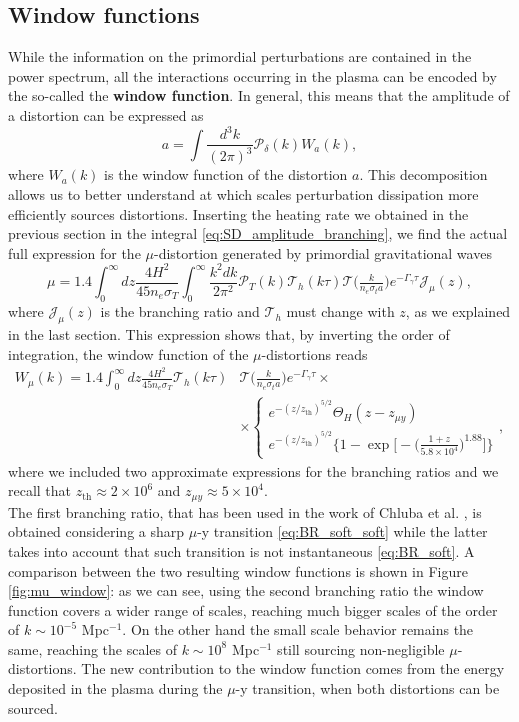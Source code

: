 \subsection{Window functions}
While the information on the primordial perturbations are contained in the power spectrum, all the interactions occurring in the plasma can be encoded by the so-called the \textbf{window function}. In general, this means that the amplitude of a distortion can be expressed as
\begin{equation}\label{eq:window_function}
    a=\int\frac{d^3k}{(2\pi)^3}\mathcal P_\delta(k) W_a(k),
\end{equation}
where $W_a(k)$ is the window function of the distortion $a$. This decomposition allows us to better understand at which scales perturbation dissipation more efficiently sources distortions. Inserting the heating rate we obtained in the previous section in the integral \eqref{eq:SD_amplitude_branching}, we find the actual full expression for the $\mu$-distortion generated by primordial gravitational waves
$$\mu=1.4\int_{0}^\infty dz\frac{4H^2}{45 n_e\sigma_T}\int_0^\infty\frac{k^2dk}{2\pi^2}\mathcal P_T(k)\mathcal T_h(k\tau)\mathcal T\Big(\tfrac{k}{n_e\sigma_ta}\Big)e^{-\Gamma_\gamma\tau}\mathcal{J}_\mu(z),$$
where $\mathcal{J}_\mu(z)$ is the branching ratio and $\mathcal T_h$ must change with $z$, as we explained in the last section.
This expression shows that, by inverting the order of integration, the window function of the $\mu$-distortions reads
\begin{align*}
    W_\mu(k)=1.4\int_{0}^\infty dz\frac{4H^2}{45 n_e\sigma_T}\mathcal T_h(k\tau)&\mathcal T\Big(\tfrac{k}{n_e\sigma_ta}\Big)e^{-\Gamma_\gamma\tau}\times\\&\times
    \begin{cases}
        e^{-(z/z_{\text{th}})^{5/2}}\Theta_H(z-z_{\mu y})\\
        e^{-(z/z_{\text{th}})^{5/2}}\Bigg\{1-\exp\bigg[-\big(\frac{1+z}{5.8\times10^4}\big)^{1.88}\bigg]\Bigg\}
    \end{cases},
\end{align*}
where we included two approximate expressions for the branching ratios and we recall that $z_\text{th}\approx 2\times 10^6$ and $z_{\mu y}\approx 5\times 10^4$.\\
The first branching ratio, that has been used in the work of Chluba et al. \cite{Chluba_tens_diss}, is obtained considering a sharp $\mu$-y transition \eqref{eq:BR_soft_soft} while the latter takes into account that such transition is not instantaneous \eqref{eq:BR_soft}. A comparison between the two resulting window functions is shown in Figure \ref{fig:mu_window}: as we can see, using the second branching ratio the window function covers a wider range of scales, reaching much bigger scales of the order of $k\sim10^{-5}$ Mpc$^{-1}$. On the other hand the small scale behavior remains the same, reaching the scales of $k\sim10^{8}$ Mpc$^{-1}$ still sourcing non-negligible $\mu$-distortions. The new contribution to the window function comes from the energy deposited in the plasma during the $\mu$-y transition, when both distortions can be sourced.
